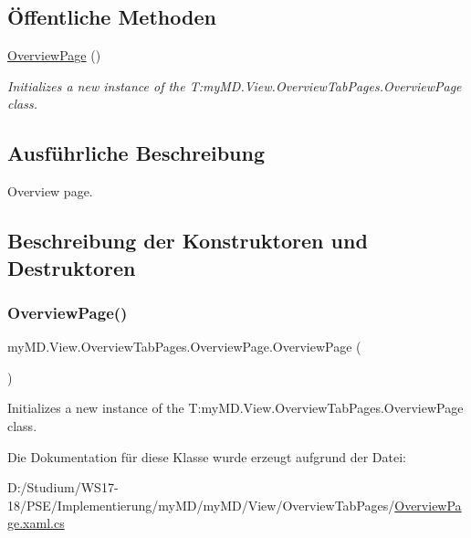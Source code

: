 \subsection*{Öffentliche Methoden}
\begin{DoxyCompactItemize}
\item 
\mbox{\hyperlink{classmy_m_d_1_1_view_1_1_overview_tab_pages_1_1_overview_page_a42d690c280c75084ebfeb81628352f8e}{Overview\+Page}} ()
\begin{DoxyCompactList}\small\item\em Initializes a new instance of the T\+:my\+M\+D.\+View.\+Overview\+Tab\+Pages.\+Overview\+Page class. \end{DoxyCompactList}\end{DoxyCompactItemize}


\subsection{Ausführliche Beschreibung}
Overview page. 



\subsection{Beschreibung der Konstruktoren und Destruktoren}
\mbox{\label{classmy_m_d_1_1_view_1_1_overview_tab_pages_1_1_overview_page_a42d690c280c75084ebfeb81628352f8e}} 
\subsubsection{\texorpdfstring{Overview\+Page()}{OverviewPage()}}
{\footnotesize\ttfamily my\+M\+D.\+View.\+Overview\+Tab\+Pages.\+Overview\+Page.\+Overview\+Page (\begin{DoxyParamCaption}{ }\end{DoxyParamCaption})}



Initializes a new instance of the T\+:my\+M\+D.\+View.\+Overview\+Tab\+Pages.\+Overview\+Page class. 



Die Dokumentation für diese Klasse wurde erzeugt aufgrund der Datei\+:\begin{DoxyCompactItemize}
\item 
D\+:/\+Studium/\+W\+S17-\/18/\+P\+S\+E/\+Implementierung/my\+M\+D/my\+M\+D/\+View/\+Overview\+Tab\+Pages/\mbox{\hyperlink{_overview_page_8xaml_8cs}{Overview\+Page.\+xaml.\+cs}}\end{DoxyCompactItemize}
